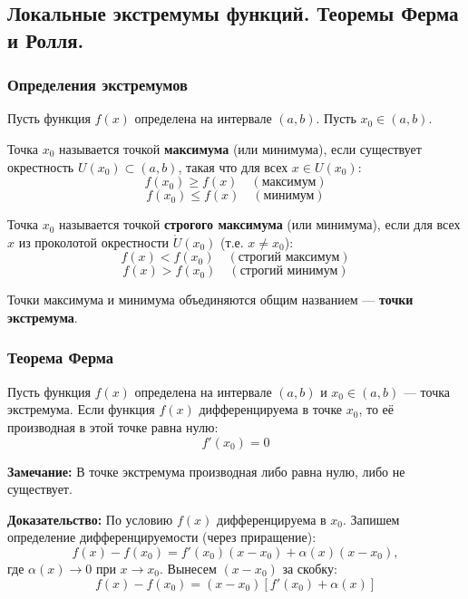 \subsection{Локальные экстремумы функций. Теоремы Ферма и Ролля.}

\subsubsection*{Определения экстремумов}

Пусть функция $f(x)$ определена на интервале $(a, b)$.
Пусть $x_0 \in (a, b)$.

\begin{tcolorbox}[title=Определение (Локальный экстремум)]
    Точка $x_0$ называется точкой \textbf{максимума} (или минимума), если существует окрестность $U(x_0) \subset (a, b)$, такая что для всех $x \in U(x_0)$:
    \[ f(x_0) \ge f(x) \quad (\text{максимум}) \]
    \[ f(x_0) \le f(x) \quad (\text{минимум}) \]
\end{tcolorbox}

\begin{tcolorbox}[title=Определение (Строгий экстремум)]
    Точка $x_0$ называется точкой \textbf{строгого максимума} (или минимума), если для всех $x$ из проколотой окрестности $\mathring{U}(x_0)$ (т.е. $x \neq x_0$):
    \[ f(x) < f(x_0) \quad (\text{строгий максимум}) \]
    \[ f(x) > f(x_0) \quad (\text{строгий минимум}) \]
\end{tcolorbox}

Точки максимума и минимума объединяются общим названием — \textbf{точки экстремума}.

\subsubsection*{Теорема Ферма}

\begin{tcolorbox}[title=Теорема Ферма (Необходимое условие экстремума)]
    Пусть функция $f(x)$ определена на интервале $(a, b)$ и $x_0 \in (a, b)$ — точка экстремума.
    Если функция $f(x)$ дифференцируема в точке $x_0$, то её производная в этой точке равна нулю:
    \[ f'(x_0) = 0 \]
\end{tcolorbox}

\textbf{Замечание:} В точке экстремума производная либо равна нулю, либо не существует.

\textbf{Доказательство:}
По условию $f(x)$ дифференцируема в $x_0$. Запишем определение дифференцируемости (через приращение):
\[ f(x) - f(x_0) = f'(x_0)(x - x_0) + \alpha(x)(x - x_0), \]
где $\alpha(x) \to 0$ при $x \to x_0$.
Вынесем $(x - x_0)$ за скобку:
\[ f(x) - f(x_0) = (x - x_0) \left[ f'(x_0) + \alpha(x) \right] \]

